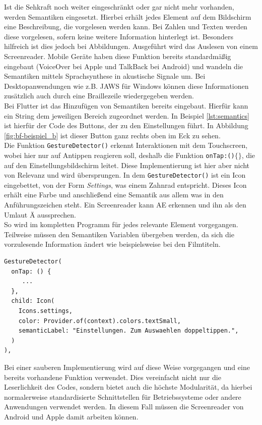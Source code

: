 \noindent
Ist die Sehkraft noch weiter eingeschränkt oder gar nicht mehr vorhanden, werden Semantiken eingesetzt. Hierbei erhält jedes Element auf dem Bildschirm eine Beschreibung, die vorgelesen werden kann. Bei Zahlen und Texten werden diese vorgelesen, sofern keine weitere Information hinterlegt ist. Besonders hilfreich ist dies jedoch bei Abbildungen. Ausgeführt wird das Auslesen von einem Screenreader. Mobile Geräte haben diese Funktion bereits standardmäßig eingebaut (VoiceOver bei Apple und TalkBack bei Android) und wandeln die Semantiken mittels Sprachsynthese in akustische Signale um. Bei Desktopanwendungen wie z.B. JAWS für Windows können diese Informationen zusätzlich auch durch eine Braillezeile wiedergegeben werden.\\
Bei Flutter ist das Hinzufügen von Semantiken bereits eingebaut. Hierfür kann ein String dem jeweiligen Bereich zugeordnet werden. In Beispiel \ref{lst:semantics} ist hierfür der Code des Buttons, der zu den Einstellungen führt. In Abbildung \ref{fig:bf-beispiel_b} ist dieser Button ganz rechts oben im Eck zu sehen.\\
Die Funktion \texttt{GestureDetector()} erkennt Interaktionen mit dem Touchscreen, wobei hier nur auf Antippen reagieren soll, deshalb die Funktion \texttt{onTap:()$\{\}$}, die auf den Einstellungsbildschirm leitet. Diese Implementierung ist hier aber nicht von Relevanz und wird übersprungen. In dem \texttt{GestureDetector()} ist ein Icon eingebettet, von der Form \textit{Settings}, was einem Zahnrad entspricht. Dieses Icon erhält eine Farbe und anschließend eine Semantik aus allem was in den Anführungszeichen steht. Ein Screenreader kann AE erkennen und ihn als den Umlaut Ä aussprechen. \\
So wird im kompletten Programm für jedes relevante Element vorgegangen. Teilweise  müssen den Semantiken Variablen übergeben werden, da sich die vorzulesende Information ändert wie beispielsweise bei den Filmtiteln.
    
\begin{lstlisting}[caption=Codeausschnitt in Dart von einem Button mit Semantiken.,label=lst:semantics]
GestureDetector(
  onTap: () {
     ...
  },
  child: Icon(
    Icons.settings,
    color: Provider.of(context).colors.textSmall,
    semanticLabel: "Einstellungen. Zum Auswaehlen doppeltippen.",
  )
),
\end{lstlisting}

\noindent
Bei einer sauberen Implementierung wird auf diese Weise vorgegangen und eine bereits vorhandene Funktion verwendet. Dies vereinfacht nicht nur die Leserlichkeit des Codes, sondern bietet auch die höchste Modularität, da hierbei normalerweise standardisierte Schnittstellen für Betriebssysteme oder andere Anwendungen verwendet werden. In diesem Fall  müssen die Screenreader von Android und Apple damit arbeiten können.\\


